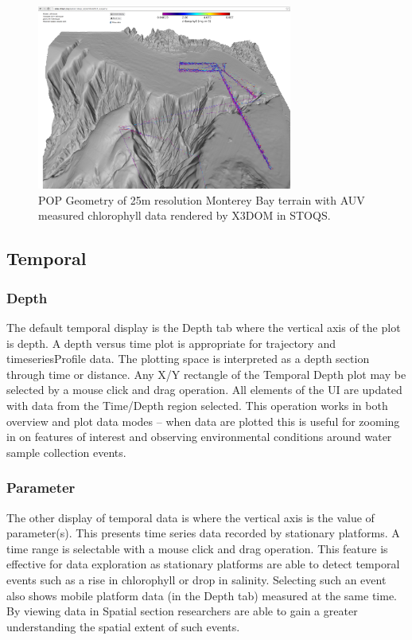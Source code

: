 \documentclass[conference]{IEEEtran}
\begin{document}
\begin{figure}[htbp]
\centering
\includegraphics[width=3.3in]{Monterey25_lrauvs.png}
\caption{POP Geometry of 25m resolution Monterey Bay terrain with AUV measured chlorophyll data rendered by X3DOM in STOQS.}
\label{fig:Monterey25_lrauvs}
\end{figure}


\subsection{Temporal}

\subsubsection{Depth}
The default temporal display is the Depth tab where the vertical axis of the plot is depth. A depth versus time plot is appropriate for trajectory and timeseriesProfile data. The plotting space is interpreted as a depth section through time or distance. Any X/Y rectangle of the Temporal Depth plot may be selected by a mouse click and drag operation. All elements of the UI are updated with data from the Time/Depth region selected. This operation works in both overview and plot data modes -- when data are plotted this is useful for zooming in on features of interest and observing environmental conditions around water sample collection events.

\subsubsection{Parameter}
The other display of temporal data is where the vertical axis is the value of parameter(s). This presents time series data recorded by stationary platforms. A time range is selectable with a mouse click and drag operation. This feature is effective for data exploration as stationary platforms are able to detect temporal events such as a rise in chlorophyll or drop in salinity. Selecting such an event also shows mobile platform data (in the Depth tab) measured at the same time. By viewing data in Spatial section researchers are able to gain a greater understanding the spatial extent of such events.
\end{document}
